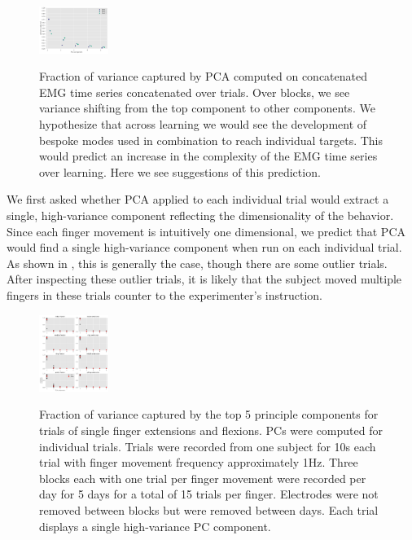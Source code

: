 \documentclass[../main.tex]{subfiles}
\begin{document}
\begin{figure}
\label{fig:PCA_concat_variance}
\centering
\includegraphics[width=0.2\textwidth]{images/data_analysis/center_hold/PCA_concat_variance.pdf}
\caption{Fraction of variance captured by PCA computed on concatenated EMG time series concatenated over trials. Over blocks, we see variance shifting from the top component to other components. We hypothesize that across learning we would see the development of bespoke modes used in combination to reach individual targets. This would predict an increase in the complexity of the EMG time series over learning. Here we see suggestions of this prediction.}\label{fig:PCA_concat_variance}
\end{figure}


We first asked whether PCA applied to each individual trial would extract a single, high-variance component reflecting the dimensionality of the behavior. Since each finger movement is intuitively one dimensional, we predict that PCA would find a single high-variance component when run on each individual trial. As shown in , this is generally the case, though there are some outlier trials. After inspecting these outlier trials, it is likely that the subject moved multiple fingers in these trials counter to the experimenter's instruction.

\begin{figure}
\label{fig:PCA_variances}
\centering
\includegraphics[width=0.2\textwidth]{images/data_analysis/fingers/PCA_variances.pdf}
\caption{Fraction of variance captured by the top 5 principle components for trials of single finger extensions and flexions. PCs were computed for individual trials. Trials were recorded from one subject for 10s each trial with finger movement frequency approximately 1Hz. Three blocks each with one trial per finger movement were recorded per day for 5 days for a total of 15 trials per finger. Electrodes were not removed between blocks but were removed between days. Each trial displays a single high-variance PC component.}\label{fig:PCA_variances}
\end{figure}
\end{document}
